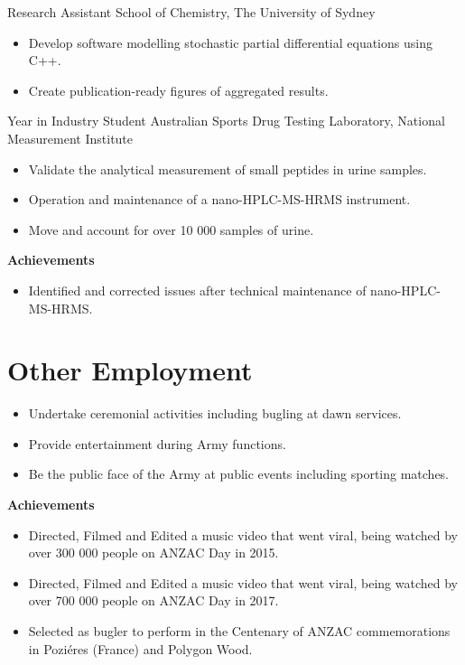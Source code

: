 {Research Assistant}
{School of Chemistry, The University of Sydney}
{}{}{%
  \begin{itemize}
    \item Develop software modelling stochastic partial differential equations using C++.
    \item Create publication-ready figures of aggregated results.
  \end{itemize}
}
\vspace{1em}

{Year in Industry Student}
{Australian Sports Drug Testing Laboratory, National Measurement Institute}
{}{}
{%
  \begin{itemize}
    \item Validate the analytical measurement of small peptides in urine samples.
    \item Operation and maintenance of a nano-HPLC-MS-HRMS instrument.
    \item Move and account for over 10 000 samples of urine.
  \end{itemize}
  \textbf{Achievements}
  \begin{itemize}
    \item Identified and corrected issues after technical maintenance of nano-HPLC-MS-HRMS.
  \end{itemize}
}
\vspace{1em}

\pagebreak
\section{Other Employment}

{}{}
{%
\begin{itemize}
  \item Undertake ceremonial activities including bugling at dawn services.
  \item Provide entertainment during Army functions.
  \item Be the public face of the Army at public events including sporting matches.
\end{itemize}
\textbf{Achievements}
\begin{itemize}
  \item Directed, Filmed and Edited a music video  that went viral, being watched by over 300 000 people on ANZAC Day in 2015.
  \item Directed, Filmed and Edited a music video  that went viral, being watched by over 700 000 people on ANZAC Day in 2017.
  \item Selected as bugler to perform in the Centenary of ANZAC commemorations in Poziéres (France) and Polygon Wood.
\end{itemize}
}
\vspace{1em}

